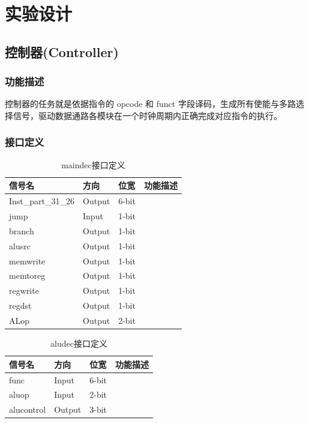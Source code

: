 \section{实验设计}
\subsection{控制器(Controller)}\label{sub:controller}
\subsubsection{功能描述}
控制器的任务就是依据指令的 opcode 和 funct 字段译码，生成所有使能与多路选择信号，驱动数据通路各模块在一个时钟周期内正确完成对应指令的执行。​​
\subsubsection{接口定义}

\begin{table}[H]
\caption{maindec接口定义}\label{tab:maindec}
\begin{center}
	\begin{tabular}{|l|l|l|p{6cm}|}
	\hline
	\textbf{信号名} & \textbf{方向} & \textbf{位宽} & \textbf{功能描述}\\ \hline \hline
	Inst\_part\_31\_26			& Output& 6-bit & \\ 
	jump			& Input& 1-bit & \\ 
	branch			& Output& 1-bit & \\ 
	alusrc			& Output& 1-bit & \\ 
	memwrite			& Output& 1-bit & \\ 
	memtoreg			& Output& 1-bit & \\ 
	regwrite			& Output& 1-bit & \\ 
	regdst			& Output& 1-bit & \\ 
	ALop			& Output& 2-bit & \\ 
	\hline
	\end{tabular}
\end{center}
\end{table}
\begin{table}[htp]
\caption{aludec接口定义}\label{tab:aludec}
\begin{center}
	\begin{tabular}{|l|l|l|p{6cm}|}
	\hline
	\textbf{信号名} & \textbf{方向} & \textbf{位宽} & \textbf{功能描述}\\ \hline \hline
	func			& Input& 6-bit & \\ 
	aluop			& Input& 2-bit & \\ 
	alucontrol			& Output& 3-bit & \\ 
	\hline
	\end{tabular}
\end{center}
\end{table}
